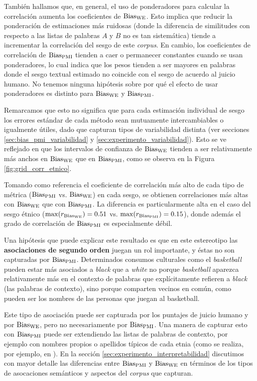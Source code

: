 También hallamos que, en general, el uso de ponderadores para calcular la correlación aumenta los coeficientes de $\operatorname{Bias_{WE}}$. Esto implica que reducir la ponderación de estimaciones más ruidosas (donde la diferencia de similitudes con respecto a las listas de palabras $A$ y $B$ no es tan sistemática) tiende a incrementar la correlación del sesgo de este \emph{corpus}. En cambio, los coeficientes de correlación de $\operatorname{Bias_{PMI}}$ tienden a caer o permanecer constantes cuando se usan ponderadores, lo cual indica que los pesos tienden a ser mayores en palabras donde el sesgo textual estimado no coincide con el sesgo de acuerdo al juicio humano. No tenemos ninguna hipótesis sobre por qué el efecto de usar ponderadores es distinto para $\operatorname{Bias_{WE}}$ y $\operatorname{Bias_{PMI}}$.

Remarcamos que esto no significa que para cada estimación individual de sesgo los errores estándar de cada método sean mutuamente intercambiables o igualmente útiles, dado que capturan tipos de variabilidad distinta (ver secciones \ref{sec:bias_pmi_variabilidad} y \ref{sec:experimento_variabilidad}). Esto se ve reflejado en que los intervalos de confianza de $\operatorname{Bias_{WE}}$ tienden a ser relativamente más anchos en $\operatorname{Bias_{WE}}$ que en $\operatorname{Bias_{PMI}}$, como se observa en la Figura \ref{fig:grid_corr_etnico}. 

Tomando como referencia el coeficiente de correlación más alto de cada tipo de métrica ($\operatorname{Bias_{PMI}}$ vs. $\operatorname{Bias_{WE}}$) en cada sesgo, se obtienen correlaciones más altas con $\operatorname{Bias_{WE}}$ que con $\operatorname{Bias_{PMI}}$. La diferencia es particularmente alta en el caso del sesgo étnico ($\max(r_{\operatorname{Bias_{WE}}})=0.51$ vs. $\max(r_{\operatorname{Bias_{PMI}}})=0.15$), donde además el grado de correlación de $\operatorname{Bias_{PMI}}$ es especialmente débil. 

Una hipótesis que puede explicar este resultado es que en este estereotipo las \textbf{asociaciones de segundo orden} juegan un rol importante, y éstas no son capturadas por $\operatorname{Bias_{PMI}}$. Determinados consumos culturales como el \emph{basketball} pueden estar más asociados a \emph{black} que a \emph{white} no porque \emph{basketball} aparezca relativamente más en el contexto de palabras que explícitamente refieren a \emph{black} (las palabras de contexto), sino porque comparten vecinos en común, como pueden ser los nombres de las personas que juegan al basketball.

Este tipo de asociación puede ser capturada por los puntajes de juicio humano y por $\operatorname{Bias_{WE}}$, pero no necesariamente por $\operatorname{Bias_{PMI}}$. Una manera de capturar esto con $\operatorname{Bias_{PMI}}$ puede ser extendiendo las listas de palabras de contexto, por ejemplo con nombres propios o apellidos típicos de cada etnia (como se realiza, por ejemplo, en \citet{garg2018word}). En la sección \ref{sec:experimento_interpretabilidad} discutimos con mayor detalle las diferencias entre $\operatorname{Bias_{PMI}}$ y $\operatorname{Bias_{WE}}$ en términos de los tipos de asocaciones semánticos y aspectos del \emph{corpus} que capturan.  


